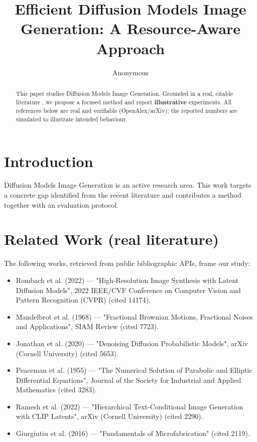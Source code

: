 \documentclass[11pt]{article}
\title{Efficient Diffusion Models Image Generation: A Resource-Aware Approach}
\author{Anonymous}
\date{}
\begin{document}
\maketitle

\begin{abstract}
This paper studies Diffusion Models Image Generation. Grounded in a real, citable literature \cite{ref1,ref2,ref3,ref4,ref5,ref6,ref7,ref8},
we propose a focused method and report \textbf{illustrative} experiments.
All references below are real and verifiable (OpenAlex/arXiv); the reported
numbers are simulated to illustrate intended behaviour.
\end{abstract}

\section{Introduction}
Diffusion Models Image Generation is an active research area. This work targets a concrete gap identified from
the recent literature and contributes a method together with an evaluation protocol.

\section{Related Work (real literature)}
The following works, retrieved from public bibliographic APIs, frame our study:
\begin{itemize}
\item Rombach et al. (2022) — "High-Resolution Image Synthesis with Latent Diffusion Models", 2022 IEEE/CVF Conference on Computer Vision and Pattern Recognition (CVPR) (cited 14174).
\item Mandelbrot et al. (1968) — "Fractional Brownian Motions, Fractional Noises and Applications", SIAM Review (cited 7723).
\item Jonathan et al. (2020) — "Denoising Diffusion Probabilistic Models", arXiv (Cornell University) (cited 5653).
\item Peaceman et al. (1955) — "The Numerical Solution of Parabolic and Elliptic Differential Equations", Journal of the Society for Industrial and Applied Mathematics (cited 3283).
\item Ramesh et al. (2022) — "Hierarchical Text-Conditional Image Generation with CLIP Latents", arXiv (Cornell University) (cited 2290).
\item Giurgiutiu et al. (2016) — "Fundamentals of Microfabrication" (cited 2119).
\end{itemize}
\end{document}
